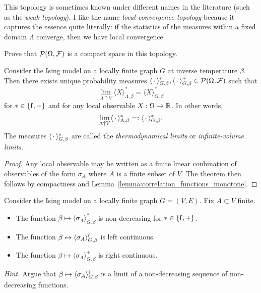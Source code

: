 \begin{remark}
    This topology is sometimes known under different names in the literature
    (such as the \emph{weak topology}).
    I like the name \emph{local convergence topology} because it captures the essence quite literally:
    if the statistics of the measures within a fixed domain $\Lambda$ converge,
    then we have local convergence.
\end{remark}

\begin{exercise}
    Prove that $\mathcal P(\Omega,\mathcal F)$ is a compact space in this topology.
\end{exercise}

\begin{theorem}
    Consider the Ising model on a locally finite graph $G$
    at inverse temperature $\beta$.
    Then there exists unique probability measures
    $\langle\,\cdot\,\rangle_{G,\beta}^{\operatorname{f}},\langle\,\cdot\,\rangle^+_{G,\beta}\in\mathcal P(\Omega,\mathcal F)$
    such that
    \[
        \lim_{\Lambda\uparrow V}\langle X\rangle_{\Lambda,\beta}^*=\langle X\rangle_{G,\beta}^*
    \]
    for $*\in\{{\operatorname{f}},+\}$ and
    for any local observable $X:\Omega\to\mathbb R$.
    In other words,
    \[
        \lim_{\Lambda\uparrow V}\langle \,\cdot\,\rangle_{\Lambda,\beta}^*
        =:
        \langle \,\cdot\,\rangle_{G,\beta}^*.
    \]
    The measures $\langle\,\cdot\,\rangle_{G,\beta}^*$ are called
    the \emph{thermodynamical limits} or \emph{infinite-volume limits}.
\end{theorem}

\begin{proof}
    Any local observable may be written as a finite linear conbination
    of observables of the form $\sigma_A$ where $A$ is a finite subset of
    $V$.
    The theorem then follows by compactness and Lemma~\ref{lemma:correlation_functions_monotone}.
\end{proof}

\begin{exercise}
    Consider the Ising model on a locally finite graph $G=(V,E)$.
    Fix $A\subset V$ finite.
    \begin{itemize}
        \item The function $\beta\mapsto \langle\sigma_A\rangle_{G,\beta}^*$ is non-decreasing for $*\in\{{\operatorname{f}},+\}$.
        \item The function $\beta\mapsto \langle\sigma_A\rangle_{G,\beta}^{\operatorname{f}}$ is left continuous.
        \item The function $\beta\mapsto \langle\sigma_A\rangle_{G,\beta}^+$ is right continuous.
    \end{itemize}
    \emph{Hint.} Argue that $\beta\mapsto \langle\sigma_A\rangle_{G,\beta}^{\operatorname{f}}$
    is a limit of a non-decreasing sequence of non-decreasing functions.
\end{exercise}

